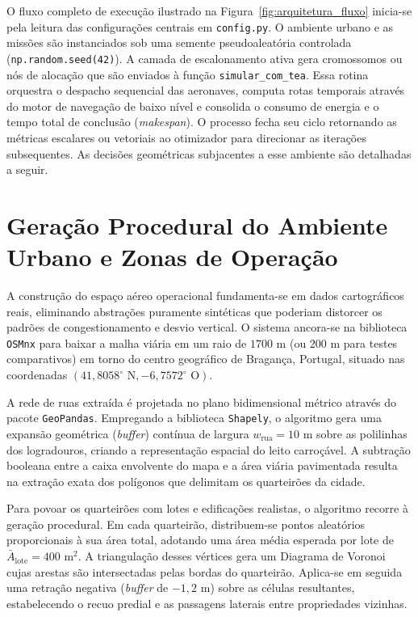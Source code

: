 O fluxo completo de execução ilustrado na Figura~\ref{fig:arquitetura_fluxo} inicia-se pela leitura das configurações centrais em \texttt{config.py}. O ambiente urbano e as missões são instanciados sob uma semente pseudoaleatória controlada (\texttt{np.random.seed(42)}). A camada de escalonamento ativa gera cromossomos ou nós de alocação que são enviados à função \texttt{simular\_com\_tea}. Essa rotina orquestra o despacho sequencial das aeronaves, computa rotas temporais através do motor de navegação de baixo nível e consolida o consumo de energia e o tempo total de conclusão (\textit{makespan}). O processo fecha seu ciclo retornando as métricas escalares ou vetoriais ao otimizador para direcionar as iterações subsequentes. As decisões geométricas subjacentes a esse ambiente são detalhadas a seguir.

\section{Geração Procedural do Ambiente Urbano e Zonas de Operação}\label{sec:ambiente_urbano}

A construção do espaço aéreo operacional fundamenta-se em dados cartográficos reais, eliminando abstrações puramente sintéticas que poderiam distorcer os padrões de congestionamento e desvio vertical. O sistema ancora-se na biblioteca \texttt{OSMnx} para baixar a malha viária em um raio de $1700\text{ m}$ (ou $200\text{ m}$ para testes comparativos) em torno do centro geográfico de Bragança, Portugal, situado nas coordenadas $(41{,}8058^\circ\text{ N}, -6{,}7572^\circ\text{ O})$.

A rede de ruas extraída é projetada no plano bidimensional métrico através do pacote \texttt{GeoPandas}. Empregando a biblioteca \texttt{Shapely}, o algoritmo gera uma expansão geométrica (\textit{buffer}) contínua de largura $w_{\text{rua}} = 10\text{ m}$ sobre as polilinhas dos logradouros, criando a representação espacial do leito carroçável. A subtração booleana entre a caixa envolvente do mapa e a área viária pavimentada resulta na extração exata dos polígonos que delimitam os quarteirões da cidade.

Para povoar os quarteirões com lotes e edificações realistas, o algoritmo recorre à geração procedural. Em cada quarteirão, distribuem-se pontos aleatórios proporcionais à sua área total, adotando uma área média esperada por lote de $\bar{A}_{\text{lote}} = 400\text{ m}^2$. A triangulação desses vértices gera um Diagrama de Voronoi cujas arestas são intersectadas pelas bordas do quarteirão. Aplica-se em seguida uma retração negativa (\textit{buffer} de $-1{,}2\text{ m}$) sobre as células resultantes, estabelecendo o recuo predial e as passagens laterais entre propriedades vizinhas.

